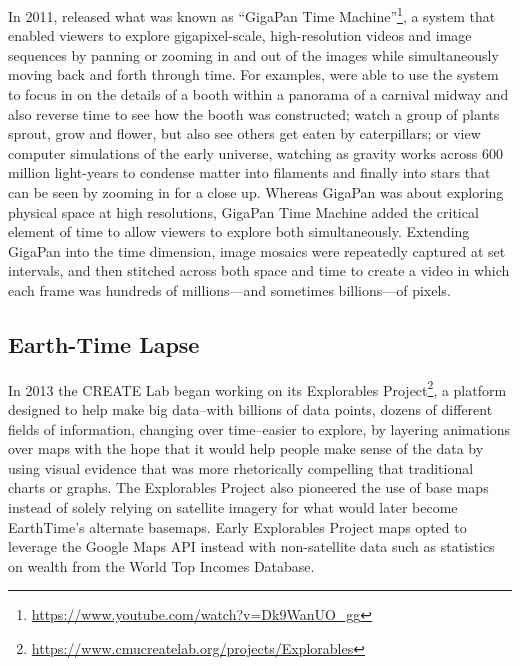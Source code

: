 \documentclass[
]{book}
\renewcommand{\href}[2]{#2\footnote{\url{#1}}}
\begin{document}
In 2011, released what was known as \href{https://www.youtube.com/watch?v=Dk9WanUO_gg}{``GigaPan Time Machine''}, a system that enabled viewers to explore gigapixel-scale, high-resolution videos and image sequences by panning or zooming in and out of the images while simultaneously moving back and forth through time. For examples, were able to use the system to focus in on the details of a booth within a panorama of a carnival midway and also reverse time to see how the booth was constructed; watch a group of plants sprout, grow and flower, but also see others get eaten by caterpillars; or view computer simulations of the early universe, watching as gravity works across 600 million light-years to condense matter into filaments and finally into stars that can be seen by zooming in for a close up. Whereas GigaPan was about exploring physical space at high resolutions, GigaPan Time Machine added the critical element of time to allow viewers to explore both simultaneously. Extending GigaPan into the time dimension, image mosaics were repeatedly captured at set intervals, and then stitched across both space and time to create a video in which each frame was hundreds of millions---and sometimes billions---of pixels.

\hypertarget{earth-time-lapse}{%
\subsection*{Earth-Time Lapse}\label{earth-time-lapse}}


In 2013 the CREATE Lab began working on its \href{https://www.cmucreatelab.org/projects/Explorables}{Explorables Project}, a platform designed to help make big data--with billions of data points, dozens of different fields of information, changing over time--easier to explore, by layering animations over maps with the hope that it would help people make sense of the data by using visual evidence that was more rhetorically compelling that traditional charts or graphs. The Explorables Project also pioneered the use of base maps instead of solely relying on satellite imagery for what would later become EarthTime's alternate basemaps. Early Explorables Project maps opted to leverage the Google Maps API instead with non-satellite data such as statistics on wealth from the World Top Incomes Database.
\end{document}
